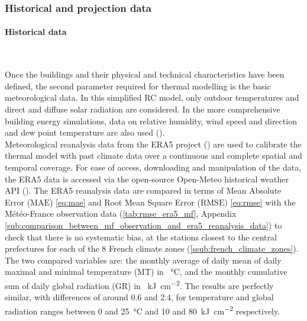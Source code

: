 \documentclass[11pt]{article}
\begin{document}
        \subsubsection{Historical and projection data} %
        \label{ssub:historical_data}
        
        \paragraph{Historical data}\mbox{}\\ %
        \label{par:historical_data}
        
        Once the buildings and their physical and technical characteristics have been defined, the second parameter required for thermal modelling is the basic meteorological data. In this simplified RC model, only outdoor temperatures and direct and diffuse solar radiation are considered. In the more comprehensive building energy simulations, data on relative humidity, wind speed and direction and dew point temperature are also used (\cite{bhandari_evaluation_2012}).\\

        Meteorological reanalysis data from the ERA5 project (\cite{hersbach_era5_2020}) are used to calibrate the thermal model with past climate data over a continuous and complete spatial and temporal coverage. For ease of access, downloading and manipulation of the data, the ERA5 data is accessed via the open-source Open-Meteo historical weather API (\cite{zippenfenig_open-meteocom_2024}). The ERA5 reanalysis data are compared in terms of Mean Absolute Error ($\mathrm{MAE}$) \eqref{eq:mae} and Root Mean Square Error ($\mathrm{RMSE}$) \eqref{eq:rmse} with the Météo-France observation data (\ref{tab:rmse_era5_mf}, Appendix \ref{sub:comparison_between_mf_observation_and_era5_reanalysis_data}) to check that there is no systematic bias, at the stations closest to the central prefectures for each of the 8 French climate zones (\ref{ssub:french_climate_zones}). The two compared variables are: the monthly average of daily mean of daily maximal and minimal temperature (MT) in \SI{}{\celsius}, and the monthly cumulative sum of daily global radiation (GR) in \SI{}{\kilo\joule\per\square\centi\meter}. The results are perfectly similar, with differences of around \num{0.6} and \num{2.4}, for temperature and global radiation ranges between 0 and \SI{25}{\celsius} and 10 and \SI{80}{\kilo\joule\per\square\centi\meter} respectively. 
\end{document}
